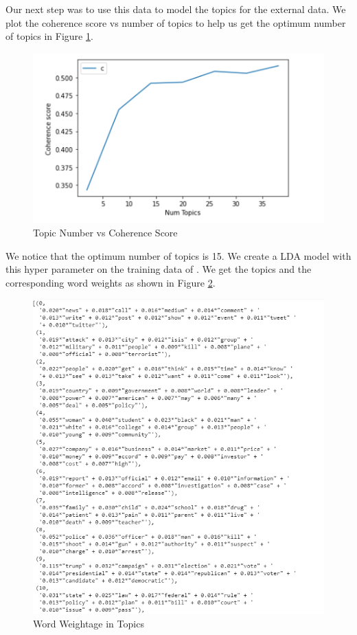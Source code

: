 \documentclass{article}
\begin{document}
Our next step was to use this data to model the topics for the external data. We plot the coherence score vs number of topics to help us get the optimum number of topics in Figure \ref{Topic Number vs Coherence Scorel}.

\begin{figure}
    \centering
    \includegraphics[scale=1.5]{score.PNG}
    \caption{Topic Number vs Coherence Score}
    \label{Topic Number vs Coherence Scorel}
\end{figure}

We notice that the optimum number of topics is 15. We create a LDA model with this hyper parameter on the training data of \cite{allnewsdata}. We get the topics and the corresponding word weights as shown in Figure \ref{Word Weightage in Topics}.

\begin{figure}
    \centering
    \includegraphics[scale=0.8]{NeuRIPS2019/words.PNG}
    \caption{Word Weightage in Topics}
    \label{Word Weightage in Topics}
\end{figure}
\end{document}
